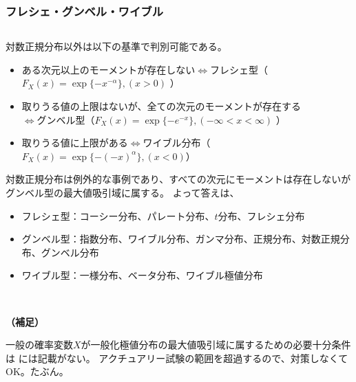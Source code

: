 \newpage



\subsubsection{フレシェ・グンベル・ワイブル}

\begin{sol}
$ $

対数正規分布以外は以下の基準で判別可能である。
\begin{itemize}
  \item ある次元以上のモーメントが存在しない$\iff$フレシェ型（$F_X(x) = \exp\{-x^{-\alpha}\}, (x > 0)$ ）
  \item 取りうる値の上限はないが、全ての次元のモーメントが存在する\\
  $\iff$グンベル型（$F_X(x) = \exp\{-e^{-x}\},  (-\infty < x < \infty)$ ） 
  \item 取りうる値に上限がある$\iff$ワイブル分布（$F_X(x) = \exp\{-(-x)^{\alpha}\}, (x < 0)$）
\end{itemize}

対数正規分布は例外的な事例であり、すべての次元にモーメントは存在しないがグンベル型の最大値吸引域に属する。
よって答えは、
\begin{itemize}
  \item フレシェ型：コーシー分布、パレート分布、$t$分布、フレシェ分布
  \item グンベル型：指数分布、ワイブル分布、ガンマ分布、正規分布、対数正規分布、グンベル分布
  \item ワイブル型：一様分布、ベータ分布、ワイブル極値分布
\end{itemize}

\end{sol}

\


\textbf{（補足）}

一般の確率変数$X$が一般化極値分布の最大値吸引域に属するための必要十分条件は
\cite{教科書}には記載がない。
アクチュアリー試験の範囲を超過するので、対策しなくてOK。たぶん。

\newpage

